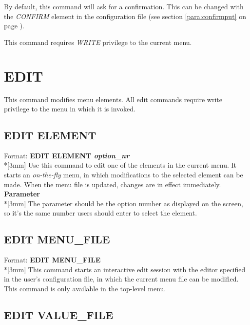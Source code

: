 \documentclass[a4paper]{book}
\newcommand{\vs}{\vspace{3mm}}
\renewcommand{\indent}{\hspace*{5mm}}
\begin{document}
\vs

By default, this command will ask for a confirmation. This can be changed 
with the \textsl{CONFIRM} element in the configuration file (see section 
\ref{para:confirmput} on page \pageref{para:confirmput}).

This command requires \textsl{WRITE} privilege to the current menu.

\section{EDIT}
\label{subsec:mylabel13}

This command modifies menu elements. All edit commands require write 
privilege to the menu in which it is invoked.

\subsection{EDIT ELEMENT}
\label{subsubsec:mylabel67}

\indent Format: \textbf{EDIT ELEMENT \textit{option{\_}nr}}\dag\\*[3mm]
Use this command to edit one of the elements in the current menu. It starts 
an \textit{on-the-fly} menu, in which modifications to the selected element can be made. When 
the menu file is updated, changes are in effect immediately.\\[3mm]
\textbf{Parameter}\\*[3mm]
The parameter should be the option number as displayed on the screen, so 
it's the same number users should enter to select the element.

\subsection{EDIT MENU{\_}FILE}
\label{subsubsec:mylabel68}

\indent Format: \textbf{EDIT MENU{\_}FILE}\dag\\*[3mm]
This command starts an interactive edit session with the editor
specified in  the user's configuration file, in which the current menu 
file can be modified. This command is only 
available in the top-level menu.

\subsection{EDIT VALUE{\_}FILE}
\label{subsubsec:mylabel69}
\end{document}
